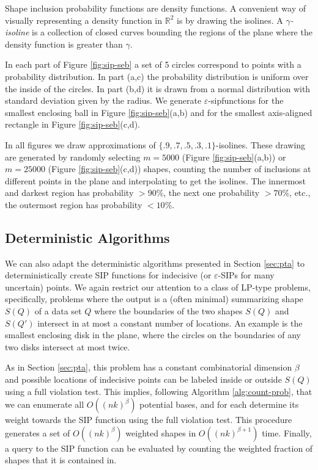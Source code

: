 \documentclass{journal}
\newcommand{\eps}{\varepsilon}
\newcommand{\R}{\ensuremath{\mathbb{R}}}
\newcommand{\sip}{\textsf{sip\xspace}}
\begin{document}
Shape inclusion probability functions are density functions.  A convenient way of visually representing a density function in $\R^2$ is by drawing the isolines.  A \emph{$\gamma$-isoline} is a collection of closed curves bounding the regions of the plane where the density function is greater than $\gamma$.

In each part of Figure \ref{fig:sip-seb} a set of 5 circles correspond to points with a probability distribution.   In part (a,c) the probability distribution is uniform over the inside of the circles.  In part (b,d) it is drawn from a normal distribution with standard deviation given by the radius.  We generate $\eps$-\sip functions for the smallest enclosing ball in Figure \ref{fig:sip-seb}(a,b) and for the smallest axis-aligned rectangle in Figure \ref{fig:sip-seb}(c,d).

In all figures we draw approximations of $\{.9,.7,.5,.3,.1\}$-isolines.
These drawing are generated by randomly selecting $m = 5000$ (Figure \ref{fig:sip-seb}(a,b)) or $m=25000$ (Figure \ref{fig:sip-seb}(c,d)) shapes, counting the number of inclusions at different points in the plane and interpolating to get the isolines.
  The innermost and darkest region has probability $> 90\%$, the next one probability $> 70\%$, etc., the outermost region has probability $< 10 \%$.





\subsection {Deterministic Algorithms}

We can also adapt the deterministic algorithms presented in Section \ref{sec:pta} to deterministically create SIP functions for indecisive (or $\eps$-SIPs for many uncertain) points.  
We again restrict our attention to a class of LP-type problems, specifically, problems where the output is a (often minimal) summarizing shape $S(Q)$ of a data set $Q$ where the boundaries of the two shapes $S(Q)$ and $S(Q')$ intersect in at most a constant number of locations.  An example is the smallest enclosing disk in the plane, where the circles on the boundaries of any two disks intersect at most twice.  

As in Section \ref{sec:pta}, this problem has a constant combinatorial dimension $\beta$ and possible locations of indecisive points can be labeled inside or outside $S(Q)$ using a full violation test.  This implies, following Algorithm \ref{alg:count-prob}, that we can enumerate all $O((nk)^\beta)$ potential bases, and for each determine its weight towards the SIP function using the full violation test.  This procedure generates a set of $O((nk)^\beta)$ weighted shapes in $O((nk)^{\beta+1})$ time.  Finally, a query to the SIP function can be evaluated by counting the weighted fraction of shapes that it is contained in.  
\end{document}
